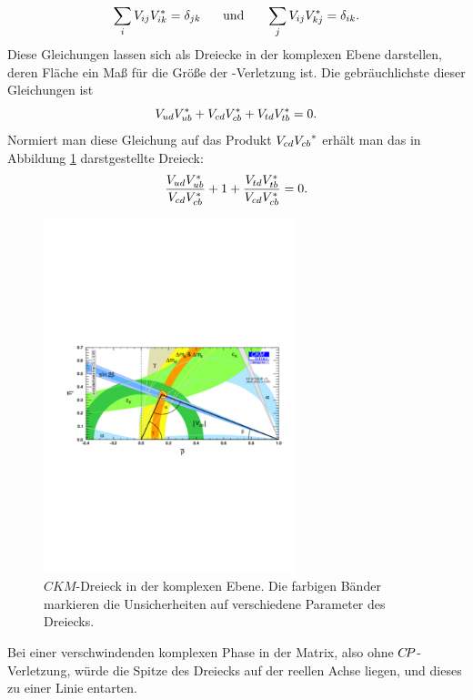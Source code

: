 \begin{equation}
\sum_{i}V_{ij}V_{ik}^*=\delta_{jk} \hspace{0.5cm}\text{ und }\hspace{0.5cm} \sum_{j}V_{ij}V_{kj}^*=\delta_{ik}.
\end{equation}
Diese Gleichungen lassen sich als Dreiecke in der komplexen Ebene darstellen, deren Fläche ein Maß für die Größe der \CP-Verletzung ist. Die gebräuchlichste dieser Gleichungen ist
\begin{equation}
{\ensuremath{V_{{u}{d}}}}{\ensuremath{V^{*}_{{u}{b}}}}+{V_{{c}{d}}}{V^{*}_{{c}{b}}}+{V_{{t}{d}}}{V^{*}_{{t}{b}}}=0.
\end{equation}
Normiert man diese Gleichung auf das Produkt ${V_{{c}{d}}}{V_{{c}{b}}}^*$ erhält man das in Abbildung \ref{fig:ckm} darstgestellte Dreieck: 
\begin{equation}
\frac{{V_{{u}{d}}}{V^{*}_{{u}{b}}}}{{V_{{c}{d}}}{V^{*}_{{c}{b}}}}+1+\frac{{V_{{t}{d}}}{V^{*}_{{t}{b}}}}{{V_{{c}{d}}}{V^{*}_{{c}{b}}}}=0.
\end{equation}
\begin{figure}[htbp]
	\begin{center}
		\includegraphics[width=0.65\textwidth]{fig/ckm_fitter.pdf}
	\caption{$C\!K\!M$-Dreieck in der komplexen Ebene. Die farbigen Bänder markieren die Unsicherheiten auf verschiedene Parameter des Dreiecks.\cite{ckm-fitter}}
	\label{fig:ckm}
 	\end{center}
\end{figure}
Bei einer verschwindenden komplexen Phase in der Matrix, also ohne ${C\!P}$-Verletzung, würde die Spitze des Dreiecks auf der reellen Achse liegen, und dieses zu einer Linie entarten.\\ 
